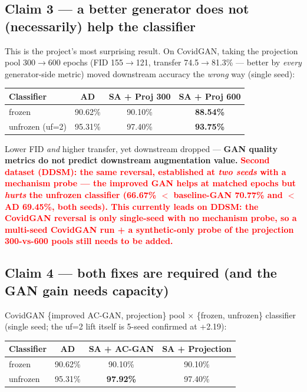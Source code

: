 \documentclass[11pt]{article}
\newcommand{\ddsmonly}[1]{\textcolor{red}{\textbf{#1}}}
\begin{document}
\subsection{Claim 3 --- a better generator does not (necessarily) help the classifier}
This is the project's most surprising result. On CovidGAN, taking the projection pool
300$\to$600 epochs (FID 155$\to$121, transfer 74.5$\to$81.3\% --- better by \emph{every}
generator-side metric) moved downstream accuracy the \emph{wrong} way (single seed):

\begin{table}[htbp]\centering\small
\begin{tabular}{@{}lccc@{}}\toprule
\textbf{Classifier} & \textbf{AD} & \textbf{SA + Proj 300} & \textbf{SA + Proj 600} \\ \midrule
frozen          & 90.62\% & 90.10\% & \textbf{88.54\%} \\
unfrozen (uf=2) & 95.31\% & 97.40\% & \textbf{93.75\%} \\
\bottomrule\end{tabular}\end{table}

\noindent Lower FID \emph{and} higher transfer, yet downstream dropped ---
\textbf{GAN quality metrics do not predict downstream augmentation value.}
\ddsmonly{Second dataset (DDSM): the same reversal, established at \emph{two seeds}
with a mechanism probe --- the improved GAN helps at matched epochs but \emph{hurts}
the unfrozen classifier (66.67\% $<$ baseline-GAN 70.77\% and $<$ AD 69.45\%, both
seeds). This currently leads on DDSM: the CovidGAN reversal is only single-seed with
no mechanism probe, so a multi-seed CovidGAN run + a synthetic-only probe of the
projection 300-vs-600 pools still needs to be added.}

\subsection{Claim 4 --- both fixes are required (and the GAN gain needs capacity)}
CovidGAN \{improved AC-GAN, projection\} pool $\times$ \{frozen, unfrozen\} classifier
(single seed; the uf=2 lift itself is 5-seed confirmed at +2.19):

\begin{table}[htbp]\centering\small
\begin{tabular}{@{}lccc@{}}\toprule
\textbf{Classifier} & \textbf{AD} & \textbf{SA + AC-GAN} & \textbf{SA + Projection} \\ \midrule
frozen   & 90.62\% & 90.10\% & 90.10\% \\
unfrozen & 95.31\% & \textbf{97.92\%} & 97.40\% \\
\bottomrule\end{tabular}\end{table}
\end{document}
